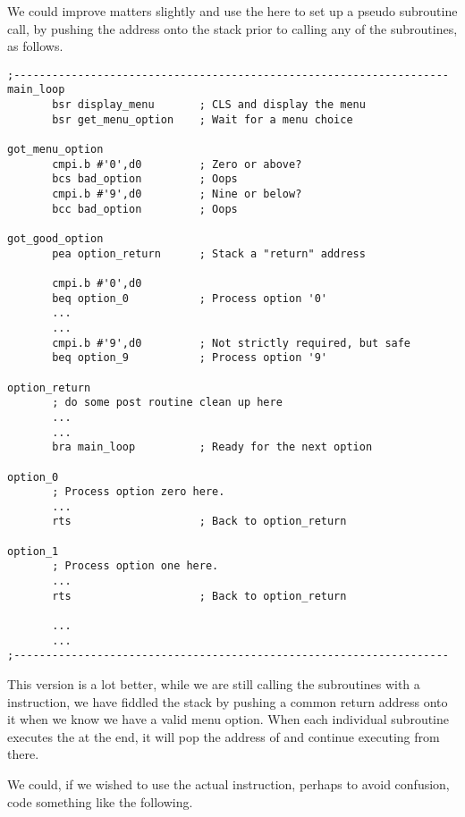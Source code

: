 We could improve matters slightly and use the  here to set up a pseudo subroutine call, by pushing the  address onto the stack prior to calling any of the subroutines, as follows.

\begin{lstlisting}[firstnumber=1,caption={Processing User Options - Improved First Attempt}]
;--------------------------------------------------------------------
main_loop
       bsr display_menu       ; CLS and display the menu
       bsr get_menu_option    ; Wait for a menu choice
       
got_menu_option
       cmpi.b #'0',d0         ; Zero or above?
       bcs bad_option         ; Oops
       cmpi.b #'9',d0         ; Nine or below?
       bcc bad_option         ; Oops
       
got_good_option
       pea option_return      ; Stack a "return" address
       
       cmpi.b #'0',d0
       beq option_0           ; Process option '0'
       ...
       ...
       cmpi.b #'9',d0         ; Not strictly required, but safe
       beq option_9           ; Process option '9'

option_return           
       ; do some post routine clean up here      
       ...
       ...
       bra main_loop          ; Ready for the next option

option_0
       ; Process option zero here.
       ...
       rts                    ; Back to option_return
       
option_1
       ; Process option one here.
       ...
       rts                    ; Back to option_return
       
       ...
       ...
;--------------------------------------------------------------------
\end{lstlisting}

This version is a lot better, while we are still calling the subroutines with a  instruction, we have fiddled the stack by pushing a common return address onto it when we know we have a valid menu option. When each individual subroutine executes the  at the end, it will pop the address of  and continue executing from there.

We could, if we wished to use the actual  instruction, perhaps to avoid confusion, code something like the following.

